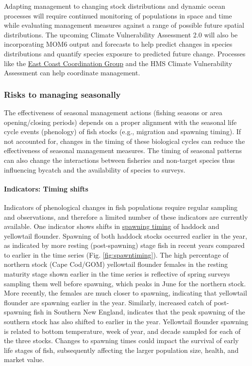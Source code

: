 \documentclass[
  10pt,
]{article}
\begin{document}
Adapting management to changing stock distributions and dynamic ocean processes will require continued monitoring of populations in space and time while evaluating management measures against a range of possible future spatial distributions. The upcoming Climate Vulnerability Assessment 2.0 will also be incorporating MOM6 output and forecasts to help predict changes in species distributions and quantify species exposure to predicted future change. Processes like the \href{https://www.mafmc.org/e3cg}{East Coast Coordination Group} and the HMS Climate Vulnerability Assessment can help coordinate management.

\subsubsection{Risks to managing seasonally}\label{risks-to-managing-seasonally}

The effectiveness of seasonal management actions (fishing seasons or area opening/closing periods) depends on a proper alignment with the seasonal life cycle events (phenology) of fish stocks (e.g., migration and spawning timing). If not accounted for, changes in the timing of these biological cycles can reduce the effectiveness of seasonal management measures. The timing of seasonal patterns can also change the interactions between fisheries and non-target species thus influencing bycatch and the availability of species to surveys.

\paragraph{Indicators: Timing shifts}\label{indicators-timing-shifts}

Indicators of phenological changes in fish populations require regular sampling and observations, and therefore a limited number of these indicators are currently available. One indicator shows shifts in \href{https://noaa-edab.github.io/catalog/spawn_timing.html}{spawning timing} of haddock and yellowtail flounder. Spawning of both haddock stocks occurred earlier in the year, as indicated by more resting (post-spawning) stage fish in recent years compared to earlier in the time series (Fig. \ref{fig:spawntiming}). The high percentage of northern stock (Cape Cod/GOM) yellowtail flounder females in the resting maturity stage shown earlier in the time series is reflective of spring surveys sampling them well before spawning, which peaks in June for the northern stock. More recently, the females are much closer to spawning, indicating that yellowtail flounder are spawning earlier in the year. Similarly, increased catch of post-spawning fish in Southern New England, indicates that the peak spawning of the southern stock has also shifted to earlier in the year. Yellowtail flounder spawning is related to bottom temperature, week of year, and decade sampled for each of the three stocks. Changes to spawning times could impact the survival of early life stages of fish, subsequently affecting the larger population size, health, and market value.
\end{document}
